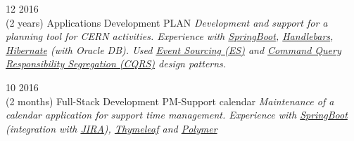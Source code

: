 \documentclass[]{friggeri-cv}
\begin{document}
\begin{entrylist}
			\entry
			{12 2016\\(2 years)}
			{Applications Development}
			{PLAN}
			{\emph{Development and support for a planning tool for CERN activities. Experience with \underline{SpringBoot}, \underline{Handlebars}, \underline{Hibernate} (with Oracle DB). Used \underline{Event Sourcing (ES)} and \underline{Command Query Responsibility Segregation (CQRS)} design patterns. } }

			\entry
			{10 2016\\(2 months)}
			{Full-Stack Development}
			{PM-Support calendar}
			{\emph{Maintenance of a calendar application for support time management. Experience with \underline{SpringBoot} (integration with \underline{JIRA}), \underline{Thymeleaf} and \underline{Polymer}}}


		\end{entrylist}
\end{document}
